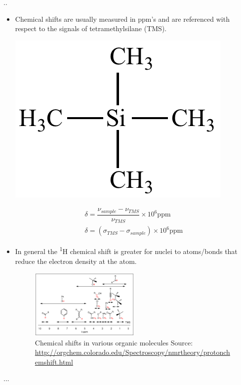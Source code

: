\documentclass{beamer}
\begin{document}
\begin{frame}{\thesection.\thesubsection. \insertsubsection}
	\begin{itemize}[<+>]
		\item Chemical shifts are usually measured in ppm's and are referenced with respect to the signals of tetramethylsilane (TMS).		
		
		\begin{minipage}[b]{0.15\textwidth}
            \centering
		  	\includegraphics[scale=0.5]{tetramethylsilane.png}	
		\end{minipage}
		\hspace{0.3cm}
		\begin{minipage}[b]{0.7\textwidth}
			{\footnotesize
		 	\begin{align}
		   	\delta = \dfrac{\nu_{sample} - \nu_{TMS}}{\nu_{TMS}}\times 10^{6} \text{ppm} \\
		   	\delta =  (\sigma_{TMS} - \sigma_{sample}) \times 10^{6} \text{ppm}
		   	\end{align}
		   }%
	    \end{minipage}
			
		
			
		
	
		\item 
		In general the \textsuperscript{1}H chemical shift is greater for nuclei to atoms/bonds that reduce the electron density at the atom. 
		\begin{figure}
		 		\centering
			 	\includegraphics[width=0.50\textwidth]{proton_chemical_shifts.png}
			 	\caption{Chemical shifts in various organic molecules Source: \url{http://orgchem.colorado.edu/Spectroscopy/nmrtheory/protonchemshift.html}}
	 	\end{figure}

	\end{itemize}
	...
\end{frame}
\end{document}
